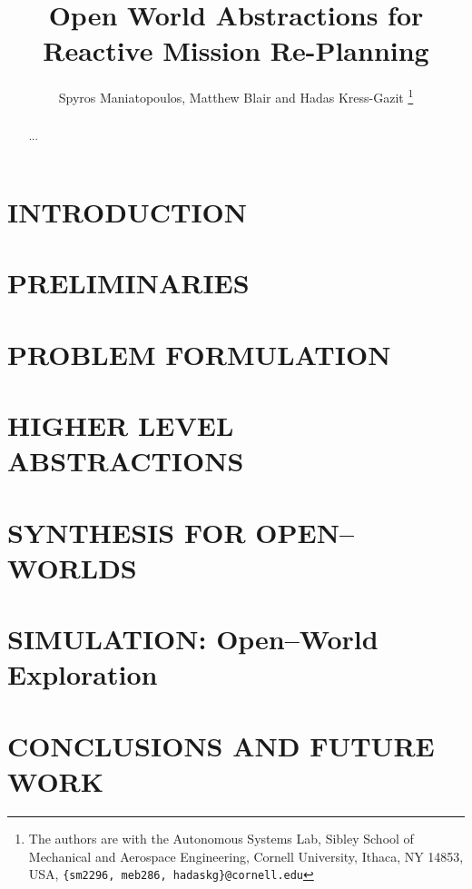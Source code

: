 \documentclass[letterpaper, 10 pt, conference]{ieeeconf}  %
\title{\LARGE \bf
	Open World Abstractions for Reactive Mission Re-Planning
}
\author{Spyros Maniatopoulos, Matthew Blair and Hadas Kress-Gazit%
\thanks{The authors are with the Autonomous Systems Lab, Sibley School of Mechanical and Aerospace Engineering, Cornell University, Ithaca, NY 14853, USA, {\tt \{sm2296, meb286, hadaskg\}@cornell.edu}}%
}
\DeclareMathOperator{\F}{\rotatebox[origin=c]{45}{$\Box$}}
\DeclareMathOperator{\X}{\bigcirc}
\DeclareMathOperator{\G}{\Box}
\DeclareMathOperator{\Cox}{
    \begin{tikzpicture}[baseline=(X.base)]
    \path[use as bounding box] (-0.16,-0.17) -- (0.16,0.17);
    \node at (0,0) {\scalebox{0.8}{$\F$}}; \node (X) at(0,0) go{$\bigcirc$}; 
    \end{tikzpicture}}
\begin{document}
\maketitle
\thispagestyle{empty}
\pagestyle{empty}


\begin{abstract}

...

\end{abstract}


\section{INTRODUCTION}


\section{PRELIMINARIES}


\section{PROBLEM FORMULATION}


\section{HIGHER LEVEL ABSTRACTIONS}\label{abstractions}


\section{SYNTHESIS FOR OPEN--WORLDS}


\section{SIMULATION: Open--World Exploration}  %


\section{CONCLUSIONS AND FUTURE WORK}

\end{document}
